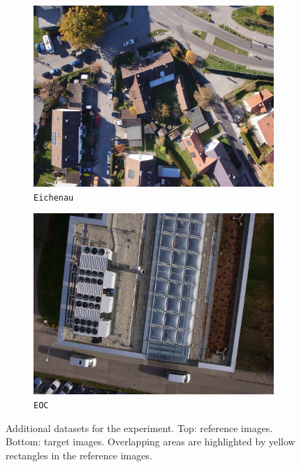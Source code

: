 \begin{figure}[tbp]
\begin{subfigure}[b]{0.3\textwidth}
           \includegraphics[width=\textwidth]{figures_dataset/eichenau_org_uav.jpg}
           \caption{\texttt{Eichenau}}
       \end{subfigure}
       \hfill
       \begin{subfigure}[b]{0.3\textwidth}
           \centering
           \includegraphics[width=\textwidth]{figures_dataset/eoc_new_org_uav.JPG}
           \caption{\texttt{EOC}}
       \end{subfigure}
       \caption{Additional datasets for the experiment. Top: reference images. Bottom: target images. Overlapping areas are highlighted by yellow rectangles in the reference images.}  
       \label{fig:datasets_2} 
\end{figure}




